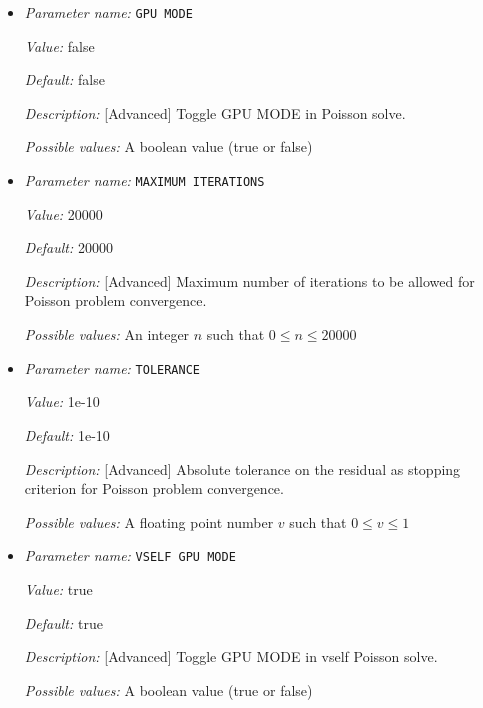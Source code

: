 \begin{itemize}
\item {\it Parameter name:} {\tt GPU MODE}
\label{parameters:Poisson problem parameters/GPU MODE}
\label{parameters:Poisson_20problem_20parameters/GPU_20MODE}


{\it Value:} false


{\it Default:} false


{\it Description:} [Advanced] Toggle GPU MODE in Poisson solve.


{\it Possible values:} A boolean value (true or false)
\item {\it Parameter name:} {\tt MAXIMUM ITERATIONS}
\label{parameters:Poisson problem parameters/MAXIMUM ITERATIONS}
\label{parameters:Poisson_20problem_20parameters/MAXIMUM_20ITERATIONS}


{\it Value:} 20000


{\it Default:} 20000


{\it Description:} [Advanced] Maximum number of iterations to be allowed for Poisson problem convergence.


{\it Possible values:} An integer $n$ such that $0\leq n \leq 20000$
\item {\it Parameter name:} {\tt TOLERANCE}
\label{parameters:Poisson problem parameters/TOLERANCE}
\label{parameters:Poisson_20problem_20parameters/TOLERANCE}


{\it Value:} 1e-10


{\it Default:} 1e-10


{\it Description:} [Advanced] Absolute tolerance on the residual as stopping criterion for Poisson problem convergence.


{\it Possible values:} A floating point number $v$ such that $0 \leq v \leq 1$
\item {\it Parameter name:} {\tt VSELF GPU MODE}
\label{parameters:Poisson problem parameters/VSELF GPU MODE}
\label{parameters:Poisson_20problem_20parameters/VSELF_20GPU_20MODE}


{\it Value:} true


{\it Default:} true


{\it Description:} [Advanced] Toggle GPU MODE in vself Poisson solve.


{\it Possible values:} A boolean value (true or false)
\end{itemize}

